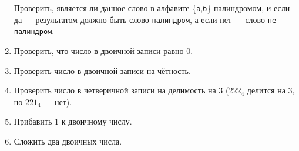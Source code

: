 \documentclass[12pt,a4paper,oneside]{article}
\newcommand{\s}[1]{\texttt{#1}}
\begin{document}
\begin{enumerate}
Проверить, является ли данное слово в алфавите \{\s{а},\s{б}\} 
палиндромом, и если да --- результатом должно быть слово \s{палиндром}, 
а если нет --- слово \s{не палиндром}.

\item Проверить, что число в двоичной записи равно 0.
\item Проверить число в двоичной записи на чётность.
\item Проверить число в четверичной записи на делимость на 3 ($222_4$ делится на 3, но $221_4$ --- нет).

\item Прибавить 1 к двоичному числу.

\item Сложить два двоичных числа.
\end{enumerate}
\end{document}

